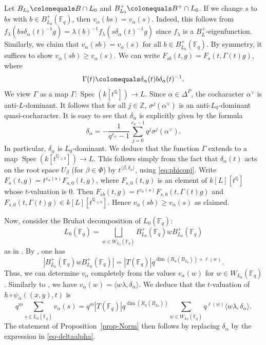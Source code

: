 \documentclass[10pt,a4paper]{article}
\numberwithin{equation}{section}
\theoremstyle{definition}
\theoremstyle{remark}
\newcommand{\FF}{\mathbb{F}}
\newcommand{\QQ}{\mathbb{Q}}
\newcommand{\ZZ}{\mathbb{Z}}
\DeclareMathOperator{\spec}{Spec}
\begin{document}
Let $B_{L_0}\colonequals B\cap L_0$ and $B^+_{L_0}\colonequals B^+\cap L_0$. If we change $s$ to $bs$ with $b\in B^{+}_{L_0}(\FF_q)$, then $v_\alpha(bs)=v_\alpha(s)$. Indeed, this follows from $f_\lambda(bs\delta_\alpha(t)^{-1}g)=\lambda(b)^{-1} f_\lambda(s\delta_\alpha(t)^{-1}g)$ since $f_\lambda$ is a $B^+_L$-eigenfunction. Similarly, we claim that $v_\alpha(sb)=v_\alpha(s)$ for all $b\in B^+_{L_0}(\FF_q)$. By symmetry, it suffices to show $v_\alpha(sb)\geq v_\alpha(s)$. We can write
$F_{sb}(t,g)=F_s(t,\Gamma(t)g)$, where
\begin{equation}
    \Gamma(t)\colonequals
    \delta_\alpha(t) b \delta_\alpha(t)^{-1}.
\end{equation}
We view $\Gamma$ as a map $\Gamma\colon \spec(k[t^\QQ])\to L$. Since $\alpha\in \Delta^P$, the cocharacter $\alpha^\vee$ is anti-$L$-dominant. It follows that for all $j\in \ZZ$, $\sigma^j(\alpha^\vee)$ is an anti-$L_0$-dominant quasi-cocharacter. It is easy to see that $\delta_\alpha$ is explicitly given by the formula
\begin{equation}\label{eq-deltaalpha}
    \delta_\alpha=-\frac{1}{q^{r_\alpha}-1}\sum_{j=0}^{r_\alpha-1}q^j\sigma^j\left(\alpha^\vee\right). 
\end{equation}
In particular, $\delta_\alpha$ is $L_0$-dominant. We deduce that the function $\Gamma$ extends to a map $\spec(k[t^{\QQ_{\geq 0}}])\to L$. This follows simply from the fact that $\delta_\alpha(t)$ acts on the root space $U_\beta$ (for $\beta\in \Phi$) by $t^{\langle \beta,\delta_\alpha \rangle}$, using \eqref{eq:phiconj}. Write $F_s(t,g)=t^{v_\alpha(s)}F_{s,0}(t,g)$, where $F_{s,0}(t,g)$ is an element of $k[L][t^\QQ]$ whose $t$-valuation is $0$. Then $F_{sb}(t,g)=t^{v_\alpha(s)}F_{s,0}(t,\Gamma(t)g)$ and 
$F_{s,0}(t,\Gamma(t)g) \in k[L][t^{\QQ_{\geq 0}}]$. 
Hence $v_\alpha(sb)\geq v_\alpha(s)$ as claimed.

Now, consider the Bruhat decomposition of $L_0(\FF_q)$:
\begin{equation}
    L_0\left(\FF_q\right)=\bigsqcup_{w\in W_{L_0}(\FF_q)} B^+_{L_0}\left(\FF_q\right) w B^+_{L_0}\left(\FF_q\right)
\end{equation}
as in \cite[Lemma 3.4.4]{Koskivirta-automforms-GZip}. By \cite[Lemma 3.4.5]{Koskivirta-automforms-GZip}, one has
\begin{equation}
  \left|B^+_{L_0}\left(\FF_q\right) w B^+_{L_0}\left(\FF_q\right)\right| =  \left|T\left(\FF_q\right)\right|q^{\dim(R_{\mathrm{u}}(B_{L_0}))+\ell(w)}.
\end{equation} 
Thus, we can determine $v_\alpha$ completely from the values $v_\alpha(w)$ for $w\in W_{L_0}(\FF_q)$. Similarly to \cite[Proposition 3.5.2]{Koskivirta-automforms-GZip}, we have $v_\alpha(w)=\langle w\lambda, \delta_\alpha \rangle$. We deduce that the $t$-valuation of $h\circ \psi_\alpha((x,y),t)$ is
\begin{equation}
 q^m\sum_{s\in L_0(\FF_q)} v_\alpha(s) =   q^m \left|T\left(\FF_q\right)\right|q^{\dim(R_{\mathrm{u}}(B_{L_0}))} \sum_{w\in W_{L_0}(\FF_q)} q^{\ell(w)}\langle w\lambda, \delta_\alpha \rangle.
\end{equation}
The statement of Proposition~\ref{prop-Norm} then follows by replacing $\delta_\alpha$ by the expression in \eqref{eq-deltaalpha}.
\end{document}
